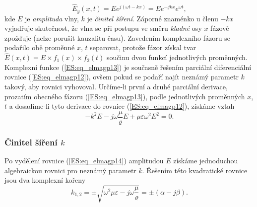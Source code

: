       \begin{equation}\label{ES:eq_elmagp13}
        \hat{E}_y(x,t) = Ee^{j(\omega t - kx)} = Ee^{-jkx}e^{\omega t},
      \end{equation}
      kde \(E\) je \emph{amplituda} vlny, \(k\) je \emph{činitel šíření}. Záporné znaménko u členu 
      \(-kx\) vyjadřuje skutečnost, že vlna se při postupu ve směru \emph{kladné} osy \(x\) fázově 
      zpožďuje (nelze porušit kauzalitu času). Zavedením komplexního fázoru se podařilo obě 
      proměnné \(x\), \(t\) separovat, protože fázor získal tvar \(\hat{E}(x,t) = E\times f_1(x) 
      \times f_2(t)\) součinu dvou funkcí jednotlivých proměnných. Komplexní funkce 
      (\ref{ES:eq_elmagp13}) je současně řešením parciální diferenciální rovnice 
      (\ref{ES:eq_elmagp12}), ovšem pokud se podaří najít neznámý parametr \(k\) takový, aby 
      rovnici vyhovoval. Určíme-li první a druhé parciální derivace, prozatím obecného 
      fázoru (\ref{ES:eq_elmagp13}), podle jednotlivých proměnných \(x\), \(t\) a dosadíme-li tyto 
      derivace do rovnice (\ref{ES:eq_elmagp12}), získáme vztah
      \begin{equation}\label{ES:eq_elmagp14}
        -k^2E -j\omega\frac{\mu}{\varrho}E +\mu\varepsilon\omega^2E^2 = 0.
      \end{equation}
      \subsubsection{Činitel šíření \(k\)}
        Po vydělení rovnice (\ref{ES:eq_elmagp14}) amplitudou \(E\) získáme jednoduchou 
        algebraickou rovnici pro neznámý parametr \(k\). Řešením této kvadratické rovnice jsou dva 
        komplexní kořeny
        \begin{equation}\label{ES:eq_elmagp15}
          k_{1,2} = \pm\sqrt{\omega^2\mu\varepsilon - j\omega\frac{\mu}{\varrho}}
                  =\pm(\alpha-j\beta).
        \end{equation}
